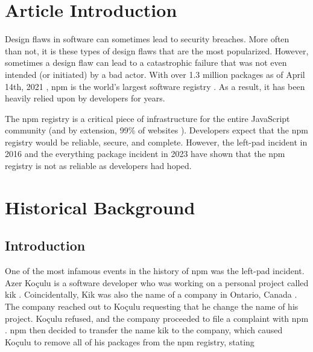 \documentclass[acmsmall]{acmart}
\begin{document}

\maketitle

\fancyfoot{}
\thispagestyle{empty}

\section{Article Introduction}
Design flaws in software can sometimes lead to security breaches. More often
than not, it is these types of design flaws that are the most popularized.
However, sometimes a design flaw can lead to a catastrophic failure that was not
even intended (or initiated) by a bad actor. With over 1.3 million packages as
of April 14th, 2021 \cite{npmblog-stats}, npm is the world's largest software
registry \cite{aboutnpm,w3schools}. As a result, it has been heavily relied upon
by developers for years.

The npm registry is a critical piece of infrastructure for the entire JavaScript
community (and by extension, 99\% of websites \cite{w3techs}). Developers expect
that the npm registry would be reliable, secure, and complete. However, the
left-pad incident in 2016 \cite{npmblog-leftpad} and the everything package
incident in 2023 \cite{youtube-everything} have shown that the npm registry is
not as reliable as developers had hoped.

\section{Historical Background}
\subsection{Introduction}
One of the most infamous events in the history of npm was the left-pad incident.
Azer Koçulu is a software developer who was working on a personal project called
kik \cite{qz}. Coincidentally, Kik was also the name of a company in Ontario,
Canada \cite{qz, crunchbase}. The company reached out to Koçulu requesting that
he change the name of his project. Koçulu refused, and the company proceeded to
file a complaint with npm \cite{qz}. npm then decided to transfer the name kik
to the company, which caused Koçulu to remove all of his packages from the npm
registry, stating
\end{document}
